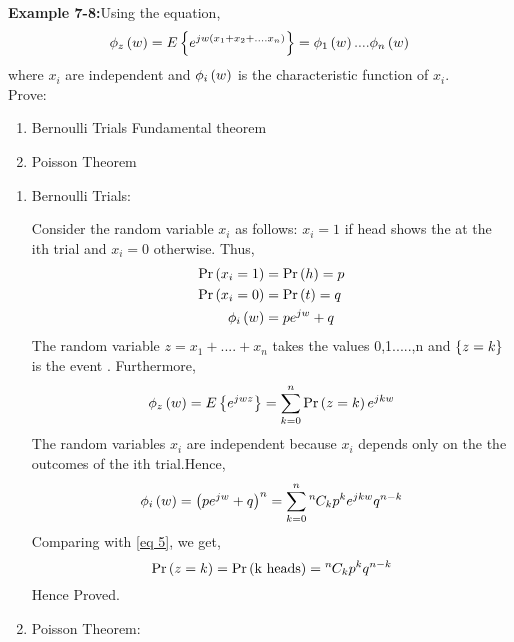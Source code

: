 \documentclass[journal,12pt,two column]{IEEEtran}
\begin{document}
\textbf{Example 7-8:}Using the equation,
\begin{equation}
    \phi_z\left(w\right) = E\left\{e^{jw(x_1+x_2+....x_n)}\right\} = \phi_1\left(w\right)....\phi_n\left(w\right) \label{Eq 1}
\end{equation}
where $x_i$ are independent and $\phi_i\left(w\right)$ is the characteristic function of $x_i$. \\
Prove:
\begin{enumerate}[label = (\alph*)]
    \item Bernoulli Trials Fundamental theorem
    \item Poisson Theorem
\end{enumerate}
\solution
\begin{enumerate}[label = (\alph*)]
    \item Bernoulli Trials:
    
    Consider the random variable $x_i$ as follows: $x_i = 1$ if head shows the at the ith trial and $x_i = 0$ otherwise. Thus,
    \begin{align}
        \Pr\left(x_i = 1\right) &= \Pr\left(h\right) = p \\
        \Pr\left(x_i = 0\right) &= \Pr\left(t\right) = q  \\
        \phi_i\left(w\right) &= pe^{jw} + q
    \end{align}
    The random variable $z = x_1 + ....+x_n$ takes the values 0,1.....,n and $\left\{z = k\right\}$ is the event . Furthermore, 
    \begin{equation}
        \phi_z\left(w\right) = E\left\{e^{jwz}\right\} = \sum_{k=0}^{n}\Pr\left(z = k\right)e^{jkw} \label{eq 5}
    \end{equation}
    The random variables $x_i$ are independent because $x_i$ depends only on the the outcomes of the ith trial.Hence,
    \begin{equation}
        \phi_i\left(w\right) = \left(pe^{jw} + q\right)^n = \sum_{k=0}^{n}{{}^{n}\mkern-1muC_{k}}p^{k}e^{jkw}q^{n-k}
    \end{equation}
    Comparing with \eqref{eq 5}, we get,
    \begin{equation}
        \Pr\left(z = k\right) = \Pr\left(\text{k heads}\right) = {{}^{n}\mkern-1muC_{k}}p^{k}q^{n-k}
    \end{equation}
    Hence Proved.
    \item Poisson Theorem:
    

\end{enumerate}
\end{document}
